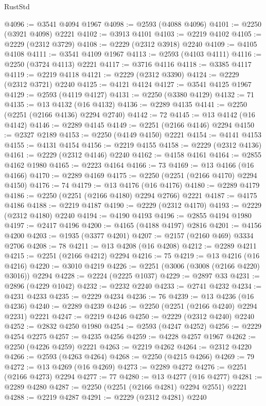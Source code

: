 \begin{lexlean}{RustStd}
\begin{coremodule}
@4096 := @3541 @4094 @1967
@4098 := @2593 (@4088 @4096)
@4101 := @2250 (@3921 @4098) @2221
@4102 := @3913 @4101
@4103 := @2219 @4102
@4105 := @2229 (@2312 @3729)
@4108 := @2229 (@2312 @3918) @2240
@4109 := @4105 @4108
@4111 := @3541 @4109 @1967
@4113 := @2593 (@4103 @4111)
@4116 := @2250 (@3724 @4113) @2221
@4117 := @3716 @4116
@4118 := @3385 @4117
@4119 := @2219 @4118
@4121 := @2229 (@2312 @3390)
@4124 := @2229 (@2312 @3721) @2240
@4125 := @4121 @4124
@4127 := @3541 @4125 @1967
@4129 := @2593 (@4119 @4127)
@4131 := @2250 (@3380 @4129)
@4132 := 71
@4135 := @13 @4132 (@16 @4132)
@4136 := @2289 @4135
@4141 := @2250 (@2251 (@2166 @4136) @2294 @2740)
@4142 := 72
@4145 := @13 @4142 (@16 @4142)
@4146 := @2289 @4145
@4149 := @2251 (@2166 @4146) @2294
@4150 := @2327 @2189
@4153 := @2250 (@4149 @4150) @2221
@4154 := @4141 @4153
@4155 := @4131 @4154
@4156 := @2219 @4155
@4158 := @2229 (@2312 @4136)
@4161 := @2229 (@2312 @4146) @2240
@4162 := @4158 @4161
@4164 := @2855 @4162 @1980
@4165 := @2223 @4164
@4166 := 73
@4169 := @13 @4166 (@16 @4166)
@4170 := @2289 @4169
@4175 := @2250 (@2251 (@2166 @4170) @2294 @4150)
@4176 := 74
@4179 := @13 @4176 (@16 @4176)
@4180 := @2289 @4179
@4186 := @2250 (@2251 (@2166 @4180) @2294 @2766) @2221
@4187 := @4175 @4186
@4188 := @2219 @4187
@4190 := @2229 (@2312 @4170)
@4193 := @2229 (@2312 @4180) @2240
@4194 := @4190 @4193
@4196 := @2855 @4194 @1980
@4197 := @2417 @4196
@4200 := @4165 (@4188 @4197) @2816
@4201 := @4156 @4200
@4203 := @1935 (@3377 @4201)
@4207 := @2157 (@2160 @469) @3334 @2706
@4208 := 78
@4211 := @13 @4208 (@16 @4208)
@4212 := @2289 @4211
@4215 := @2251 (@2166 @4212) @2294
@4216 := 75
@4219 := @13 @4216 (@16 @4216)
@4220 := @3010 @4219
@4226 := @2251 (@3006 (@3008 (@2166 @4220) @3016)) @2294
@4228 := @2224 (@2225 @1037)
@4229 := @2897 @33
@4231 := @2896 (@4229 @1042)
@4232 := @2232 @2240
@4233 := @2741 @4232
@4234 := @4231 @4233
@4235 := @2229 @4234
@4236 := 76
@4239 := @13 @4236 (@16 @4236)
@4240 := @2289 @4239
@4246 := @2250 (@2251 (@2166 @4240) @2294 @2231) @2221
@4247 := @2219 @4246
@4250 := @2229 (@2312 @4240) @2240
@4252 := @2832 @4250 @1980
@4254 := @2593 (@4247 @4252)
@4256 := @2229 @4254 @2275
@4257 := @4235 @4256
@4259 := @4228 @4257 @1967
@4262 := @2250 (@4226 @4259) @2221
@4263 := @2219 @4262
@4264 := @2312 @4220
@4266 := @2593 (@4263 @4264)
@4268 := @2250 (@4215 @4266)
@4269 := 79
@4272 := @13 @4269 (@16 @4269)
@4273 := @2289 @4272
@4276 := @2251 (@2166 @4273) @2294
@4277 := 77
@4280 := @13 @4277 (@16 @4277)
@4281 := @2289 @4280
@4287 := @2250 (@2251 (@2166 @4281) @2294 @2551) @2221
@4288 := @2219 @4287
@4291 := @2229 (@2312 @4281) @2240

\end{coremodule}
\end{lexlean}
